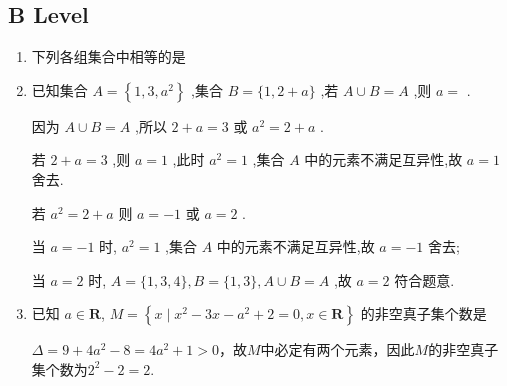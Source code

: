 \subsection*{B Level}
\begin{enumerate}

    \item 下列各组集合中相等的是
    \begin{jieda}
        \begin{dingautolist}{172}
            \item 均为偶数集
            \item $P = \{1, -1\}$，$Q = \{0, 1\}$
            \item 均为奇数集
            \item 表示元素的符号不一样，$P = [1, +\infty)$，$Q = (-\infty, +\infty)$
        \end{dingautolist}
    \end{jieda}
    \item 已知集合 $A = \left\{  {1,3,{a}^{2}}\right\}$ ,集合 $B = \{ 1,2 + a\}$ ,若 $A \cup  B = A$ ,则 $a =$ .
    \begin{jieda}
        因为 $A \cup  B = A$ ,所以 $2 + a = 3$ 或 ${a}^{2} = 2 + a$ .

        若 $2 + a = 3$ ,则 $a = 1$ ,此时 ${a}^{2} = 1$ ,集合 ${A}$ 中的元素不满足互异性,故 $a = 1$ 舍去.
        
        若 ${a}^{2} = 2 + a$ 则 $a =  - 1$ 或 $a = 2$ .
        
        当 $a =  - 1$ 时, ${a}^{2} = 1$ ,集合 ${A}$ 中的元素不满足互异性,故 $a =  - 1$ 舍去;
        
        当 $a = 2$ 时, $A = \{ 1,3,4\} ,B = \{ 1,3\} ,A \cup  B = A$ ,故 $a = 2$ 符合题意.
    \end{jieda}
    \item 已知 $a \in \mathbf{R}$, $M = \left\{  {x \mid  {x}^{2} - {3x} - {a}^{2} + 2 = 0,x \in  \mathbf{R}}\right\}$ 的非空真子集个数是 
    \begin{jieda}
        $\Delta = 9 + 4a^2 - 8 = 4a^2 + 1 > 0$，故$M$中必定有两个元素，因此$M$的非空真子集个数为$2^2 - 2 = 2$.
    \end{jieda}
    

\end{enumerate}
